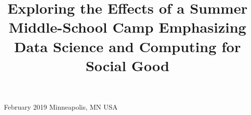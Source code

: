 



  {February 2019}
  {Minneapolis, MN USA} 





\title[A Middle School Camp: Data Science \& Computing for Social Good]{Exploring the Effects of a Summer Middle-School Camp Emphasizing Data Science and Computing for Social Good}

